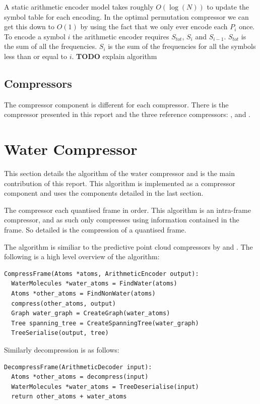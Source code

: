 \documentclass{report}
\newcommand{\todo}{\textbf{TODO} }
\begin{document}
A static arithmetic encoder model takes roughly $O(\log(N))$ to update the
symbol table for each encoding. In the optimal permutation compressor we can
get this down to $O(1)$ by using the fact that we only ever encode each $P_i$
once. To encode a symbol $i$ the arithmetic encoder requires $S_{tot}$, $S_i$
and $S_{i-1}$. $S_{tot}$ is the sum of all the frequencies. $S_i$ is the sum
of the frequencies for all the symbols less than or equal to $i$. \todo
explain algorithm


\subsection{Compressors}

The compressor component is different for each compressor. There is the
compressor presented in this report and the three reference compressors:
\citet{omeltchenko2000sls}, \citet{gumholdcomp} and \citet{devillers2000gci}.


\section{Water Compressor}

This section details the algorithm of the water compressor and is the main
contribution of this report. This algorithm is implemented as a compressor
component and uses the components detailed in the last section.

The compressor each quantised frame in order. This algorithm is an intra-frame
compressor, and as such only compresses using information contained in the
frame. So detailed is the compression of a quantised frame.

The algorithm is similiar to the predictive point cloud compressors by
\cite{gumholdcomp} and \cite{merrycomp}. The following is a high level
overview of the algorithm:

\begin{verbatim}
CompressFrame(Atoms *atoms, ArithmeticEncoder output):
  WaterMolecules *water_atoms = FindWater(atoms)
  Atoms *other_atoms = FindNonWater(atoms)
  compress(other_atoms, output)
  Graph water_graph = CreateGraph(water_atoms)
  Tree spanning_tree = CreateSpanningTree(water_graph)
  TreeSerialise(output, tree)
\end{verbatim}

\noindent Similarly decompression is as follows:

\begin{verbatim}
DecompressFrame(ArithmeticDecoder input):
  Atoms *other_atoms = decompress(input)
  WaterMolecules *water_atoms = TreeDeserialise(input)
  return other_atoms + water_atoms
\end{verbatim}
\end{document}
